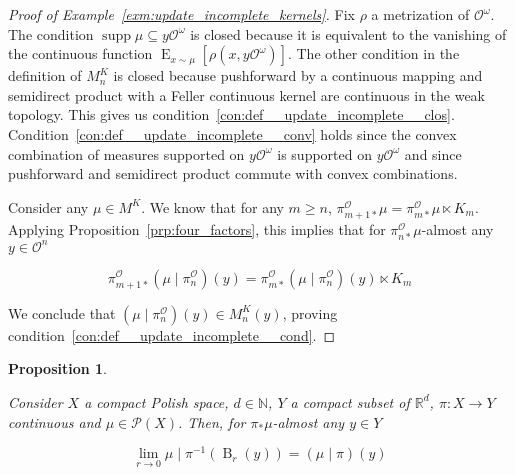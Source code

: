 \documentclass[aop,preprint]{imsart}
\numberwithin{equation}{section}
\theoremstyle{definition}
\theoremstyle{plain}
\newtheorem{proposition}{Proposition}[section]
\newcommand{\Nats}{\mathbb{N}}
\newcommand{\Reals}{\mathbb{R}}
\newcommand{\B}{\operatorname{B}}
\DeclareMathOperator{\E}{E}
\newcommand{\PM}{\mathcal{P}}
\DeclareMathOperator{\Sp}{supp}
\newcommand{\Ob}{\mathcal{O}}
\newcommand{\OO}{\Ob^\omega}
\newcommand{\PO}{\pi^\Ob}
\begin{document}
\begin{proof}[Proof of Example~\ref{exm:update_incomplete_kernels}]
Fix $\rho$ a metrization of $\OO$. The condition $\Sp{\mu} \subseteq y\OO$ is closed because it is equivalent to the vanishing of the continuous function $\E_{x\sim\mu}\left[\rho\left(x,y\OO\right)\right]$. The other condition in the definition of $M^K_n$ is closed because pushforward by a continuous mapping and semidirect product with a Feller continuous kernel are continuous in the weak topology. This gives us condition~\ref{con:def__update_incomplete__clos}. Condition~\ref{con:def__update_incomplete__conv} holds since the convex combination of measures supported on $y\OO$ is supported on $y\OO$ and since pushforward and semidirect product commute with convex combinations.

Consider any $\mu \in M^K$. We know that for any $m \geq n$, $\PO_{m+1*}\mu=\PO_{m*}\mu \ltimes K_m$. Applying Proposition~\ref{prp:four_factors}, this implies that for $\PO_{n*}\mu$-almost any $y\in\Ob^n$

\[\PO_{m+1*}\left(\mu \mid \PO_n\right)(y)=\PO_{m*}\left(\mu \mid \PO_n\right)(y) \ltimes K_m\]

We conclude that $\left(\mu \mid \PO_n\right)(y) \in M^K_n(y)$, proving condition~\ref{con:def__update_incomplete__cond}.
\end{proof}

\begin{samepage}
\begin{proposition}
\label{prp:differentiation}

Consider $X$ a compact Polish space, $d \in \Nats$, $Y$ a compact subset of $\Reals^d$, $\pi: X \rightarrow Y$ continuous and $\mu \in \PM\left(X\right)$. Then, for $\pi_*\mu$-almost any $y \in Y$

\begin{equation}
\lim_{r \rightarrow 0}{\mu \mid \pi^{-1}\left(\B_r\left(y\right)\right) = \left(\mu \mid \pi\right)\left(y\right)}
\end{equation}

\end{proposition}
\end{samepage}
\end{document}
